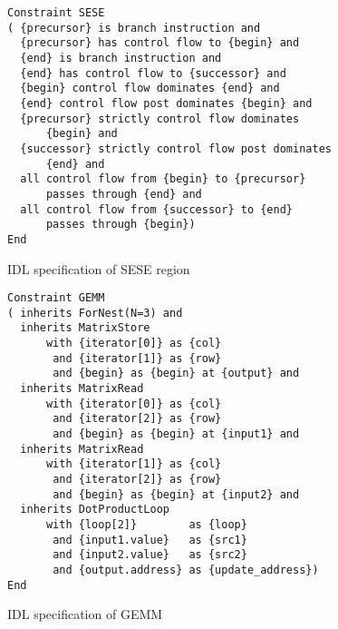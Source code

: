 
\begin{figure}[p]
\begin{lstlisting}[language={constraints},numbers=none,xleftmargin=0cm,framexleftmargin=0em,basicstyle=\linespread{1.133}\scriptsize\ttfamily]
Constraint SESE
( {precursor} is branch instruction and
  {precursor} has control flow to {begin} and
  {end} is branch instruction and
  {end} has control flow to {successor} and
  {begin} control flow dominates {end} and
  {end} control flow post dominates {begin} and
  {precursor} strictly control flow dominates
      {begin} and
  {successor} strictly control flow post dominates
      {end} and
  all control flow from {begin} to {precursor}
      passes through {end} and
  all control flow from {successor} to {end}
      passes through {begin})
End
\end{lstlisting}
\vspace{-.3cm}
\caption{IDL specification of SESE region\vspace{-.3em}}
\label{fig:sese}
\end{figure}

\begin{figure}[p]
\vspace{.512cm}
\begin{lstlisting}[language={constraints},numbers=none,xleftmargin=0cm,framexleftmargin=0em,basicstyle=\linespread{1.133}\scriptsize\ttfamily]
Constraint GEMM
( inherits ForNest(N=3) and
  inherits MatrixStore
      with {iterator[0]} as {col}
       and {iterator[1]} as {row}
       and {begin} as {begin} at {output} and
  inherits MatrixRead
      with {iterator[0]} as {col}
       and {iterator[2]} as {row}
       and {begin} as {begin} at {input1} and
  inherits MatrixRead
      with {iterator[1]} as {col}
       and {iterator[2]} as {row}
       and {begin} as {begin} at {input2} and
  inherits DotProductLoop
      with {loop[2]}        as {loop}
       and {input1.value}   as {src1}
       and {input2.value}   as {src2}
       and {output.address} as {update_address})
End
\end{lstlisting}
\vspace{-.3cm}
\caption{IDL specification of GEMM}
\label{fig:gemm}
\vspace{.512cm}
\end{figure}

